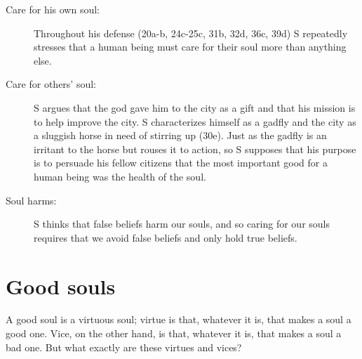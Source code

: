 \documentclass[oneside]{article}
\begin{document}
\begin{description}
\item[Care for his own soul:] Throughout his defense (20a-b, 24c-25c, 31b, 32d, 36c, 39d) S repeatedly stresses that a human being must care for their soul more than anything else. 
\item[Care for others' soul:] S argues that the god gave him to the city as a gift and that his mission is to help improve the city.  S characterizes himself as a gadfly and the city as a sluggish horse in need of stirring up (30e).  Just as the gadfly is an irritant to the horse but rouses it to action, so S supposes that his purpose is to persuade his fellow citizens that the most important good for a human being was the health of the soul.
\item[Soul harms:] S thinks that false beliefs harm our souls, and so caring for our souls requires that we avoid false beliefs and only hold true beliefs. 
\end{description}

\section{Good souls}
A good soul is a virtuous soul; virtue is that, whatever it is, that makes a soul a good one. Vice, on the other hand, is that, whatever it is, that makes a soul a bad one. But what exactly are these virtues and vices? 
\end{document}
